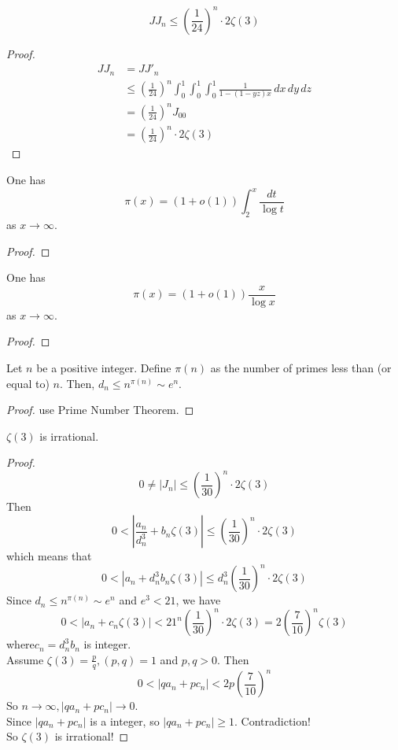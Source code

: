 \begin{theorem}\label{JJ_upper}
    \[ JJ_n \leqslant (\frac{1}{24})^n\cdot 2\zeta(3) \]
\end{theorem}
\begin{proof}
    \leanok
    \begin{align*}
        JJ_n &= JJ'_n \\
        &\leqslant (\frac{1}{24})^n \int_{0}^{1}\int_{0}^{1}\int_{0}^{1} \frac{1}{1-(1-yz)x} \, dx \, dy \, dz \\
        &= (\frac{1}{24})^n J_{00} \\
        &= (\frac{1}{24})^n \cdot 2\zeta(3)
    \end{align*}
\end{proof}

\begin{lemma}\label{pi_asymp}
  One has
  $$ \pi(x) = (1+o(1)) \int_2^x \frac{dt}{\log t}$$
  as $x \to \infty$.
\end{lemma}
\begin{proof}
    \leanok
\end{proof}

\begin{lemma}\label{pi_alt}
    One has 
    \[ \pi(x) = (1 + o(1))\frac{x}{\log x}\]
    as $x \rightarrow \infty$.
\end{lemma}
\begin{proof}
    \leanok
\end{proof}

\begin{lemma}\label{dn_asymptotic}
    Let $n$ be a positive integer. Define $\pi(n)$ as the number of primes less than (or equal to) $n$. Then, $d_n \leqslant n^{\pi(n)} \sim e^n$.
\end{lemma}
\begin{proof}
    \leanok
    use Prime Number Theorem. 
\end{proof}

\begin{theorem}\label{zeta_3_irrational}
    $\zeta(3)$ is irrational.
\end{theorem}
\begin{proof}
    \leanok
    \[ 0 \neq |J_n| \leqslant (\frac{1}{30})^n\cdot 2\zeta(3) \]
    Then 
    \[ 0 < |\frac{a_n}{d_n^3} + b_n\zeta(3)| \leqslant (\frac{1}{30})^n\cdot 2\zeta(3) \]
    which means that 
    \[ 0 < |a_n + d_n^3 b_n\zeta(3)| \leqslant d_n^3(\frac{1}{30})^n\cdot 2\zeta(3) \] 
    Since $d_n \leqslant n^{\pi(n)} \sim e^n$ and $e^3 < 21$, we have
    \[ 0 < |a_n + c_n\zeta(3)| < 21^n (\frac{1}{30})^n\cdot 2\zeta(3) = 2(\frac{7}{10})^n \zeta(3) \]
    where$c_n = d_n^3 b_n$ is integer.\\
    Assume $\zeta(3) = \frac{p}{q}, (p,q)=1$ and $p,q>0$. Then 
    \[ 0 < |qa_n + pc_n| < 2p (\frac{7}{10})^n \]
    So $n \rightarrow \infty, |qa_n + pc_n| \rightarrow 0$.\\
    Since $|qa_n + pc_n|$ is a integer, so $|qa_n + pc_n| \geqslant 1$. Contradiction! \\
    So $\zeta(3)$ is irrational!
\end{proof}